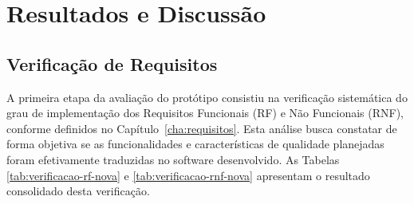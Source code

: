 

\chapter{Resultados e Discussão}\label{cha:resultados}

\section{Verificação de Requisitos}

A primeira etapa da avaliação do protótipo consistiu na verificação sistemática do grau de implementação dos Requisitos Funcionais (RF) e Não Funcionais (RNF), conforme definidos no Capítulo~\ref{cha:requisitos}. Esta análise busca constatar de forma objetiva se as funcionalidades e características de qualidade planejadas foram efetivamente traduzidas no software desenvolvido. As Tabelas \ref{tab:verificacao-rf-nova} e \ref{tab:verificacao-rnf-nova} apresentam o resultado consolidado desta verificação.

